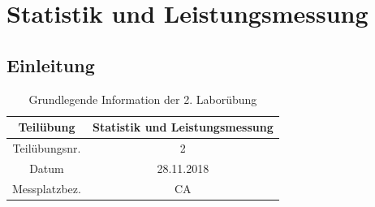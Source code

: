 \chapter{Statistik und Leistungsmessung}
\section{Einleitung}
\begin{table}[h]
	\centering
	\begin{tabular}{|c|c|}
		\hline 
		Teilübung 	& Statistik und Leistungsmessung \\
		\hline 
		Teilübungsnr. 		& 2	 \\ 
		\hline 
		Datum 		& 28.11.2018 \\ 
		\hline 
		Messplatzbez. 	& CA \\
		\hline
	\end{tabular} 
	\caption{Grundlegende Information der 2. Laborübung}
\end{table}

